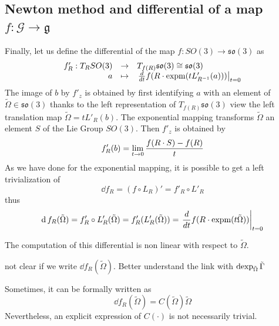 \subsection{Newton method and differential of a map $f : \mathcal G \rightarrow \mathfrak g$}
Finally, let us define the differential of the map $f : SO(3) \rightarrow \mathfrak {so}(3)$ as
\begin{equation}
  \label{eq:183}
  \begin{array}[rcl]{rcl}
    f'_R : T_RSO(3) &\rightarrow&T_{f(R)}\mathfrak {so}(3) \cong  \mathfrak {so}(3)\\
           a &\mapsto& \left.\frac{d}{dt} f(R\glaw \expm(t L'_{R^{-1}}(a))) \right|_{t=0}
  \end{array}
\end{equation}
The image of $b$ by $f'_z$   is obtained by first identifying $a$ with an element of $\tilde\Omega \in \mathfrak {so}(3)$ thanks to the left representation of $T_{f(R)}\mathfrak {so}(3)$ view the left translation map $\tilde\Omega= t L'_R(b)$. The exponential mapping transforms $\tilde\Omega$ an element $S$ of the Lie Group $SO(3)$. Then $f'_z$ is obtained by
\begin{equation}
  \label{eq:184}
  f'_R(b) = \lim_{t\rightarrow 0} \frac{f(R\cdot S) - f(R)}{t}
\end{equation}
As we have done for the exponential mapping, it is possible to get a left trivialization of
\begin{equation}
  \label{eq:185}
  \dd f_R = (f\circ L_R)' = f'_R \circ L'_R
\end{equation}
thus
\begin{equation}
  \label{eq:186}
  \operatorname{d} f_R (\tilde\Omega) =  f'_R \circ L'_R(\tilde\Omega) = f'_R(L'_R(\tilde\Omega)) =  \left.\frac{d}{dt} f(R\cdot \operatorname{expm}(t \tilde\Omega )) \right|_{t=0}
\end{equation}

\begin{ndrva}
  The computation of this differential is non linear with respect to $\tilde\Omega$.


  not clear if we write $\dd f_R (\tilde\Omega)$. Better understand the link with $\operatorname{dexp}_{\tilde \Omega}{\tilde\Gamma}$
\end{ndrva}
Sometimes, it can be formally written as
\begin{equation}
  \label{eq:180}
  \dd f_R (\tilde\Omega) = C(\tilde\Omega)\tilde\Omega
\end{equation}
Nevertheless, an explicit expression of $C(\cdot)$ is not necessarily trivial.

